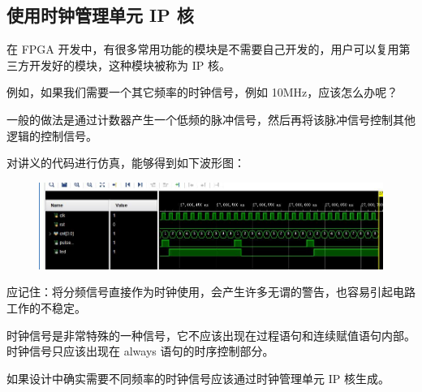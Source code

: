 \documentclass[UTF8]{article}
\begin{document}
	\subsection{使用时钟管理单元 IP 核}
	在 FPGA 开发中，有很多常用功能的模块是不需要自己开发的，用户可以复用第三方开发好的模块，这种模块被称为 IP 核。\par
	例如，如果我们需要一个其它频率的时钟信号，例如 10MHz，应该怎么办呢？\par
	一般的做法是通过计数器产生一个低频的脉冲信号，然后再将该脉冲信号控制其他逻辑的控制信号。\par
	对讲义的代码进行仿真，能够得到如下波形图：\par
	\begin{figure}[H]
		\centering
		\includegraphics[width=1\linewidth]{s4_1.jpg}
		\label{s4_1}
	\end{figure}\par
	应记住：将分频信号直接作为时钟使用，会产生许多无谓的警告，也容易引起电路工作的不稳定。\par
	时钟信号是非常特殊的一种信号，它不应该出现在过程语句和连续赋值语句内部。时钟信号只应该出现在 always 语句的时序控制部分。\par
	如果设计中确实需要不同频率的时钟信号应该通过时钟管理单元 IP 核生成。\par 
\end{document}
